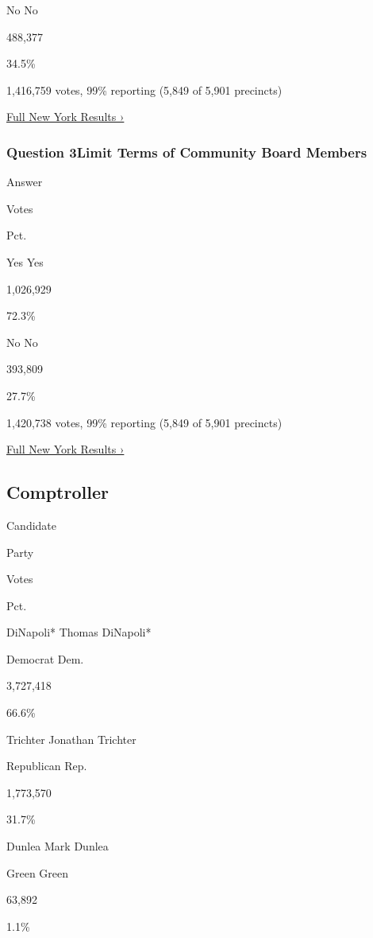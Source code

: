  No No

488,377

34.5\%

1,416,759 votes, 99\% reporting (5,849 of 5,901 precincts)

\href{https://www.nytimes3xbfgragh.onion/interactive/2018/11/06/us/elections/results-new-york-elections.html}{Full
New York Results ›}

\hypertarget{question-3limit-terms-of-community-board-members}{%
\subsubsection{Question 3Limit Terms of Community Board
Members}\label{question-3limit-terms-of-community-board-members}}

Answer

Votes

Pct.

 Yes Yes

1,026,929

72.3\%

 No No

393,809

27.7\%

1,420,738 votes, 99\% reporting (5,849 of 5,901 precincts)

\href{https://www.nytimes3xbfgragh.onion/interactive/2018/11/06/us/elections/results-new-york-elections.html}{Full
New York Results ›}

\hypertarget{comptroller}{%
\subsection{Comptroller}\label{comptroller}}

Candidate

Party

Votes

Pct.

 DiNapoli* Thomas DiNapoli*

Democrat Dem.

3,727,418

66.6\%

 Trichter Jonathan Trichter

Republican Rep.

1,773,570

31.7\%

 Dunlea Mark Dunlea

Green Green

63,892

1.1\%

